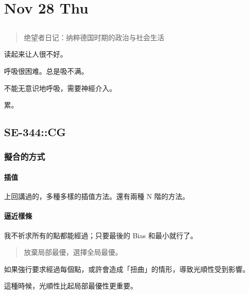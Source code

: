 \documentclass[
]{article}
\date{}
\begin{document}
\hypertarget{header-n0}{%
\section{Nov 28 Thu}\label{header-n0}}

\hypertarget{header-n2}{%
\subsection{\texorpdfstring{ }{ }}\label{header-n2}}

\begin{quote}
绝望者日记：纳粹德国时期的政治与社会生活
\end{quote}

读起来让人很不好。

呼吸很困难。总是吸不满。

不能无意识地呼吸，需要神經介入。

累。

\hypertarget{header-n9}{%
\subsection{SE-344::CG}\label{header-n9}}

\hypertarget{header-n10}{%
\subsubsection{擬合的方式}\label{header-n10}}

\hypertarget{header-n11}{%
\paragraph{插值}\label{header-n11}}

上回講過的，多種多樣的插值方法。還有兩種 N 階的方法。

\hypertarget{header-n13}{%
\paragraph{逼近樣條}\label{header-n13}}

我不祈求所有的點都能經過；只要最後的 Bias 和最小就行了。

\begin{quote}
放棄局部最優，選擇全局最優。
\end{quote}

如果強行要求經過每個點，或許會造成「扭曲」的情形，導致光順性受到影響。

這種時候，光順性比起局部最優性更重要。
\end{document}

